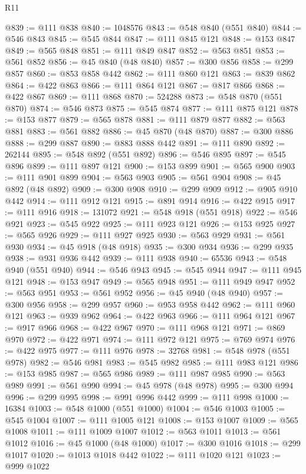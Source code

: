 \begin{lexlean}{R11}
\begin{coremodule}
{{{{{{{{{{{{{{{{{{{{{{{{{{{{{{{{{{{{{{{{{{{{{{{{{{{{{{{{{{{{{{{{{{{{{{{{{{{{{{{{{{@839 := @111 @838
@840 := 1048576
@843 := @548 @840 (@551 @840)
@844 := @546 @843
@845 := @545 @844
@847 := @111 @845 @121
@848 := @153 @847
@849 := @565 @848
@851 := @111 @849 @847
@852 := @563 @851
@853 := @561 @852
@856 := @45 @840 (@48 @840)
@857 := @300 @856
@858 := @299 @857
@860 := @853 @858 @442
@862 := @111 @860 @121
@863 := @839 @862
@864 := @422 @863
@866 := @111 @864 @121
@867 := @817 @866
@868 := @422 @867
@869 := @111 @868
@870 := 524288
@873 := @548 @870 (@551 @870)
@874 := @546 @873
@875 := @545 @874
@877 := @111 @875 @121
@878 := @153 @877
@879 := @565 @878
@881 := @111 @879 @877
@882 := @563 @881
@883 := @561 @882
@886 := @45 @870 (@48 @870)
@887 := @300 @886
@888 := @299 @887
@890 := @883 @888 @442
@891 := @111 @890
@892 := 262144
@895 := @548 @892 (@551 @892)
@896 := @546 @895
@897 := @545 @896
@899 := @111 @897 @121
@900 := @153 @899
@901 := @565 @900
@903 := @111 @901 @899
@904 := @563 @903
@905 := @561 @904
@908 := @45 @892 (@48 @892)
@909 := @300 @908
@910 := @299 @909
@912 := @905 @910 @442
@914 := @111 @912 @121
@915 := @891 @914
@916 := @422 @915
@917 := @111 @916
@918 := 131072
@921 := @548 @918 (@551 @918)
@922 := @546 @921
@923 := @545 @922
@925 := @111 @923 @121
@926 := @153 @925
@927 := @565 @926
@929 := @111 @927 @925
@930 := @563 @929
@931 := @561 @930
@934 := @45 @918 (@48 @918)
@935 := @300 @934
@936 := @299 @935
@938 := @931 @936 @442
@939 := @111 @938
@940 := 65536
@943 := @548 @940 (@551 @940)
@944 := @546 @943
@945 := @545 @944
@947 := @111 @945 @121
@948 := @153 @947
@949 := @565 @948
@951 := @111 @949 @947
@952 := @563 @951
@953 := @561 @952
@956 := @45 @940 (@48 @940)
@957 := @300 @956
@958 := @299 @957
@960 := @953 @958 @442
@962 := @111 @960 @121
@963 := @939 @962
@964 := @422 @963
@966 := @111 @964 @121
@967 := @917 @966
@968 := @422 @967
@970 := @111 @968 @121
@971 := @869 @970
@972 := @422 @971
@974 := @111 @972 @121
@975 := @769 @974
@976 := @422 @975
@977 := @111 @976
@978 := 32768
@981 := @548 @978 (@551 @978)
@982 := @546 @981
@983 := @545 @982
@985 := @111 @983 @121
@986 := @153 @985
@987 := @565 @986
@989 := @111 @987 @985
@990 := @563 @989
@991 := @561 @990
@994 := @45 @978 (@48 @978)
@995 := @300 @994
@996 := @299 @995
@998 := @991 @996 @442
@999 := @111 @998
@1000 := 16384
@1003 := @548 @1000 (@551 @1000)
@1004 := @546 @1003
@1005 := @545 @1004
@1007 := @111 @1005 @121
@1008 := @153 @1007
@1009 := @565 @1008
@1011 := @111 @1009 @1007
@1012 := @563 @1011
@1013 := @561 @1012
@1016 := @45 @1000 (@48 @1000)
@1017 := @300 @1016
@1018 := @299 @1017
@1020 := @1013 @1018 @442
@1022 := @111 @1020 @121
@1023 := @999 @1022
}}}}}}}}}}}}}}}}}}}}}}}}}}}}}}}}}}}}}}}}}}}}}}}}}}}}}}}}}}}}}}}}}}}}}}}}}}}}}}}}}}
\end{coremodule}
\end{lexlean}
